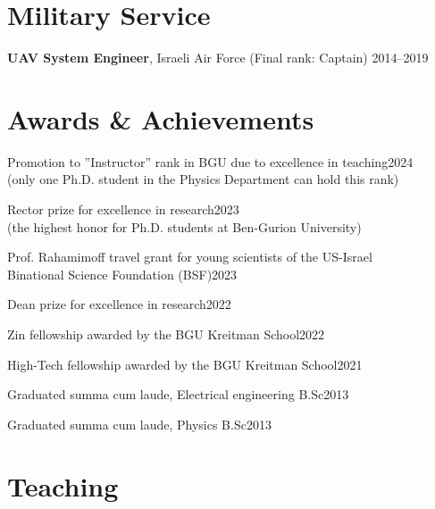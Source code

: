 \documentclass[letterpaper,12pt]{article}
\renewenvironment{itemize}{
  \begin{list}{}{
    \setlength{\leftmargin}{1.5em}
  }
}{
  \end{list}
}
\begin{document}
\section*{Military Service}

\begin{itemize}
	\item {\bf UAV System Engineer}, Israeli Air Force (Final rank: Captain) \hfill 2014--2019
\end{itemize}

\newpage
\section*{Awards \& Achievements}

\begin{itemize}
	\item Promotion to ''Instructor'' rank in BGU due to excellence in teaching\hfill 2024\\(only one Ph.D. student in the Physics Department can hold this rank)
	\item Rector prize for excellence in research\hfill 2023\\(the highest honor for Ph.D. students at Ben-Gurion University)
	\item Prof. Rahamimoff travel grant for young scientists of the US-Israel \\Binational Science Foundation (BSF)\hfill 2023
	\item Dean prize for excellence in research\hfill 2022%
	\item Zin fellowship awarded by the BGU Kreitman School\hfill 2022
	\item High-Tech fellowship awarded by the BGU Kreitman School\hfill 2021
	\item Graduated summa cum laude, Electrical engineering B.Sc\hfill 2013
	\item Graduated summa cum laude, Physics B.Sc\hfill 2013	
\end{itemize}

\vspace{-5mm}
\section*{Teaching}
\end{document}

